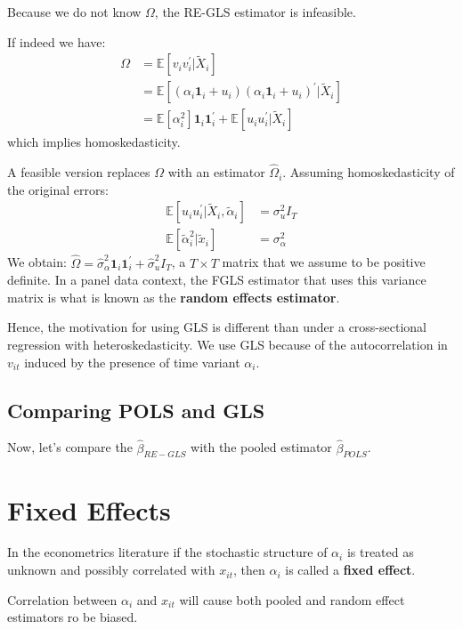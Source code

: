 Because we do not know $\Omega$, the RE-GLS estimator is infeasible. 

If indeed we have:
\begin{align*}
    \Omega &= \mathbb{E}[v_i v_i^{\prime}  | \tilde{X}_i] \\
    &= \mathbb{E}[(\alpha_i \mathbf{1}_i + u_i)(\alpha_i \mathbf{1}_i  + u_i)^{\prime}  | \tilde{X}_i] \\
    &= \mathbb{E}[\alpha_i^2] \mathbf{1}_i \mathbf{1}_i^{\prime} + \mathbb{E}[u_i u_i^{\prime} | \tilde{X}_i]
\end{align*}
which implies homoskedasticity.

A feasible version replaces $\Omega$ with an estimator $\hat{\Omega}_i$.
Assuming homoskedasticity of the original errors:
\begin{align*}
    \mathbb{E}[u_i u_i^{\prime}  | \tilde{X}_i, \tilde{\alpha}_i] &= \sigma_u^2 I_T \\
    \mathbb{E}[\tilde{\alpha}_i^2 | \tilde{x}_i] &= \sigma_{\alpha}^2
\end{align*}
We obtain: $\hat{\Omega} = \hat{\sigma}_{\alpha}^2 \mathbf{1}_i \mathbf{1}_i^{\prime} + \hat{\sigma}_u^2 I_T$, 
a $T \times T$ matrix that we assume to be positive definite.
In a panel data context, the FGLS estimator that uses this variance matrix is what is known as the \textbf{random effects estimator}.

Hence, the motivation for using GLS is different than under a cross-sectional regression with heteroskedasticity.
We use GLS because of the autocorrelation in $v_{it}$ induced by the presence of time variant $\alpha_i$.

\subsection{Comparing POLS and GLS}

Now, let's compare the $\hat{\beta}_{RE-GLS}$ with the pooled estimator $\hat{\beta}_{POLS}$.

\section{Fixed Effects}
In the econometrics literature if the stochastic structure of $\alpha_i$ is treated as unknown
and possibly correlated with $x_{it}$, then $\alpha_i$ is called a \textbf{fixed effect}.

Correlation between $\alpha_i$ and $x_{it}$ will cause both pooled and random effect estimators ro be biased.

